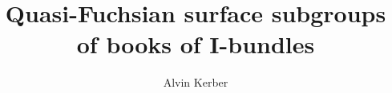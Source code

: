 \documentclass[12pt]{amsart}
\begin{document}
\title{Quasi-Fuchsian surface subgroups of books of I-bundles}

\author{Alvin Kerber}



\maketitle












\end{document}
